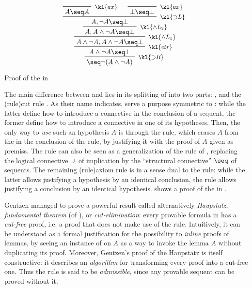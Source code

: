 \begin{marginfigure}
  $$
  \R[\kl{{\limp}R}]
  {\R[\kl{ctr}]
  {\R[\kl{\land L_1}]
  {\R[\kl{\land L_2}]
  {\R[\kl{{\limp}L}]
    {\R[\kl{ax}]
    {A \seq A}}
    {\R[\kl{ax}]
    {\bot \seq \bot}}
    {A, \neg A \seq \bot}}
  {A, A \land \neg A \seq \bot}}
  {A \land \neg A, A \land \neg A \seq \bot}}
  {A \land \neg A \seq \bot}}
  {\seq \neg (A \land \neg A)}
  $$
  \caption{Proof of the  in }
\end{marginfigure}

\AP
The main difference between  and 
lies in its splitting of  into two parts: , and the \intro(rule){cut} rule . As their name
indicates,  serve a purpose symmetric to : while the latter define how to introduce a connective in
the conclusion of a sequent, the former define how to introduce a connective in
one of its hypotheses. Then, the only way to \emph{use} such an hypothesis $A$
is through the  rule, which erases $A$ from the  in the
conclusion of the rule, by justifying it with the proof of $A$ given as premiss.
The  rule can also be seen as a generalization of the 
rule of , replacing the logical connective $\supset$ of
implication by the ``structural connective'' $\seq$ of sequents. The remaining
\intro(rule){axiom} rule  is in a sense dual to the  rule:
while the latter allows justifying a hypothesis by an identical conclusion, the
 rule allows justifying a conclusion by an identical
hypothesis.  shows
a proof of the  in .

Gentzen managed to prove a powerful result called alternatively
\textit{Haupstatz}, \emph{fundamental theorem} (of ), or
\emph{cut-elimination}: every provable formula in  has a
\emph{cut-free} proof, i.e. a proof that does not make use of the 
rule. Intuitively, it can be understood as a formal justification for the
possibility to \emph{inline} proofs of lemmas, by seeing an instance of
 on $A$ as a way to invoke the lemma $A$ without duplicating its proof.
Moreover, Gentzen's proof of the Haupstatz is itself constructive: it describes
an \emph{algorithm} for transforming every  proof into a
cut-free one. Thus the  rule is said to be \emph{admissible}, since any
provable sequent can be proved without it.

